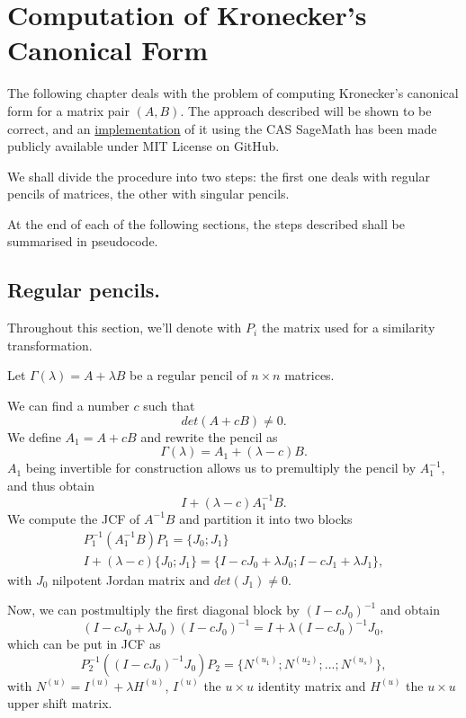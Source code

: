\section{Computation of Kronecker's Canonical Form}
The following chapter deals with the problem of computing Kronecker's canonical form for a matrix pair \((A, B)\).
The approach described will be shown to be correct, and an
\href{https://github.com/liviusi/kronecker-canonical-form}{implementation}
of it using the CAS SageMath has been made publicly available under MIT License on GitHub.


We shall divide the procedure into two steps: the first one deals with regular pencils of matrices, the other with
singular pencils.

At the end of each of the following sections, the steps described shall be summarised in pseudocode.

\subsection*{Regular pencils.}
Throughout this section, we'll denote with \(P_{i}\) the matrix used for a similarity transformation.

Let \(\Gamma(\lambda) = A + \lambda B\) be a regular pencil of \(n \times n\) matrices.

We can find a number \(c\) such that
\[
    det(A + cB) \neq 0.
\]
We define \(A_{1} = A + cB\) and rewrite the pencil as
\[
    \Gamma(\lambda) = A_{1} + (\lambda - c)B.
\]
\(A_{1}\) being invertible for construction allows us to premultiply the pencil by \(A_{1}^{-1}\), and thus obtain
\[
    I + (\lambda - c)A_{1}^{-1} B.
\]
We compute the JCF of \(A^{-1}B\) and partition it into two blocks
\begin{gather*}
    P_{1}^{-1} (A_{1}^{-1} B) P_{1} = \{ J_{0}; J_{1} \}\\
    I + (\lambda - c)\{J_{0}; J_{1}\} = \{I - cJ_{0} + \lambda J_{0}; I - cJ_{1} + \lambda J_{1}\},
\end{gather*}
with \(J_{0}\) nilpotent Jordan matrix and \(det(J_{1}) \neq 0\).

Now, we can postmultiply the first diagonal block by \((I -cJ_{0})^{-1}\) and obtain
\[
    (I - cJ_{0} + \lambda J_{0}) (I - cJ_{0})^{-1} = I + \lambda(I - cJ_{0})^{-1} J_{0},
\]
which can be put in JCF as
\[
    P_{2}^{-1} ((I - cJ_{0})^{-1} J_{0}) P_{2} = \{N^{(u_{1})}; N^{(u_{2})}; ...; N^{(u_{s})}\},
\]
with \(N^{(u)} = I^{(u)} + \lambda H^{(u)}\), \(I^{(u)}\) the \(u \times u\) identity matrix and \(H^{(u)}\) the
\(u \times u\) upper shift matrix.

